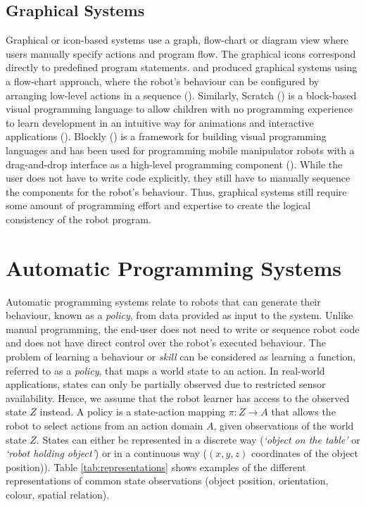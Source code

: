 \subsection{Graphical Systems}\label{sssec:Graphical systems}
Graphical or icon-based systems use a graph, flow-chart or diagram view where users manually specify actions and program flow.
The graphical icons correspond directly to predefined program statements.
\cite{lego2003} and \cite{bischoff2002morpha} produced graphical systems using a flow-chart approach, where the robot's behaviour can be configured by arranging low-level actions in a sequence ().
Similarly, Scratch (\cite{majed2014learn}) is a block-based visual programming language to allow children with no programming experience to learn development in an intuitive way for animations and interactive applications ().
Blockly (\cite{fraser2013blockly}) is a framework for building visual programming languages and has been used for programming mobile manipulator robots with a drag-and-drop interface as a high-level programming component (\cite{huang2016design}).
While the user does not have to write code explicitly, they still have to manually sequence the components for the robot's behaviour.
Thus, graphical systems still require some amount of programming effort and expertise to create the logical consistency of the robot program.
\section{Automatic Programming Systems}\label{subsec:Automatic Programming Systems}
Automatic programming systems relate to robots that can generate their behaviour, known as a \textit{policy}, from data provided as input to the system.
Unlike manual programming, the end-user does not need to write or sequence robot code and does not have direct control over the robot's executed behaviour.
The problem of learning a behaviour or \textit{skill} can be considered as learning a function, referred to as a \textit{policy}, that maps a world state to an action.
In real-world applications, states can only be partially observed due to restricted sensor availability.
Hence, we assume that the robot learner has access to the observed state $Z$ instead.
A policy is a state-action mapping $\pi : Z \rightarrow A$ that allows the robot to select actions from an action domain $A$, given observations of the world state $Z$.
States can either be represented in a discrete way (\eg \textit{`object on the table'} or \textit{`robot holding object'}) or in a continuous way (\eg $(x,y,z)$ coordinates of the object position)).
Table \ref{tab:representations} shows examples of the different representations of common state observations (\eg object position, orientation, colour, spatial relation).

